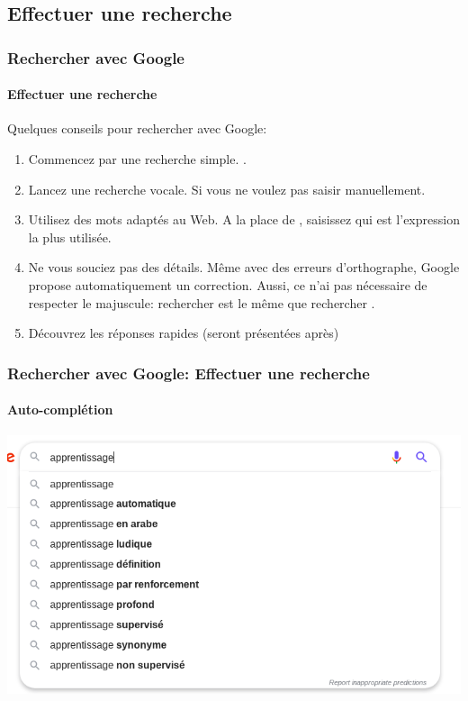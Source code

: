 \documentclass[xcolor=table]{beamer}
\begin{document}
\subsection{Effectuer une recherche}

\begin{frame}
\frametitle{Rechercher avec Google}
\framesubtitle{Effectuer une recherche}

Quelques conseils pour rechercher avec Google: 
\begin{enumerate}
	\item Commencez par une recherche simple. .
	
	\item Lancez une recherche vocale. Si vous ne voulez pas saisir manuellement.
	
	\item Utilisez des mots adaptés au Web. A la place de , saisissez  qui est l'expression la plus utilisée.
	
	\item Ne vous souciez pas des détails. Même avec des erreurs d'orthographe, Google propose automatiquement un correction. Aussi, ce n'ai pas nécessaire de respecter le majuscule: rechercher  est le même que rechercher .
	
	\item Découvrez les réponses rapides (seront présentées après)
\end{enumerate}

\end{frame}

\begin{frame}
\frametitle{Rechercher avec Google: Effectuer une recherche}
\framesubtitle{Auto-complétion}

\begin{center}
	\includegraphics[height=.85\textheight]{..//img/Bweb02-ri-gmail/google-autocomplete.png}
\end{center}

\end{frame}
\end{document}
